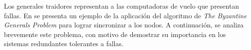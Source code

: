 Los generales traidores representan a las computadoras de vuelo que presentan fallas. En \cite{wensley1978sift} se presenta un ejemplo de la aplicación del algoritmo de \textit{The Byzantine Generals Problem} para lograr sincronizar a los nodos. A continuación, se analiza brevemente este problema, con motivo de demostrar su importancia en los sistemas redundantes tolerantes a fallas.






